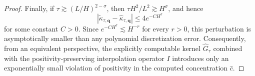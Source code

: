 \documentclass[10pt,a4paper]{amsart}
\begin{document}
\begin{proof}
Finally, if
$\tau\gtrsim(L/H)^{2-\sigma}$, then
$\tau H^2/L^2\gtrsim H^\sigma$, and hence
\begin{equation}
\left|
\widetilde{\kappa}_{\tau,\mathbf q}
-
\hat{\kappa}_{\tau,\mathbf q}
\right|
\leq
4e^{-CH^\sigma}
\end{equation}
for some constant $C>0$. Since $e^{-CH^\sigma} \lesssim H^{-r}$ for every
$r>0$, this perturbation is asymptotically smaller than any polynomial
discretization error. Consequently, from an equivalent perspective, the explicitly computable kernel $\widehat{G}_{\tau}$ combined with the positivity-preserving interpolation operator $I$ introduces only an exponentially small violation of positivity in the computed concentration $\hat{c}$.
\end{proof}
\end{document}
